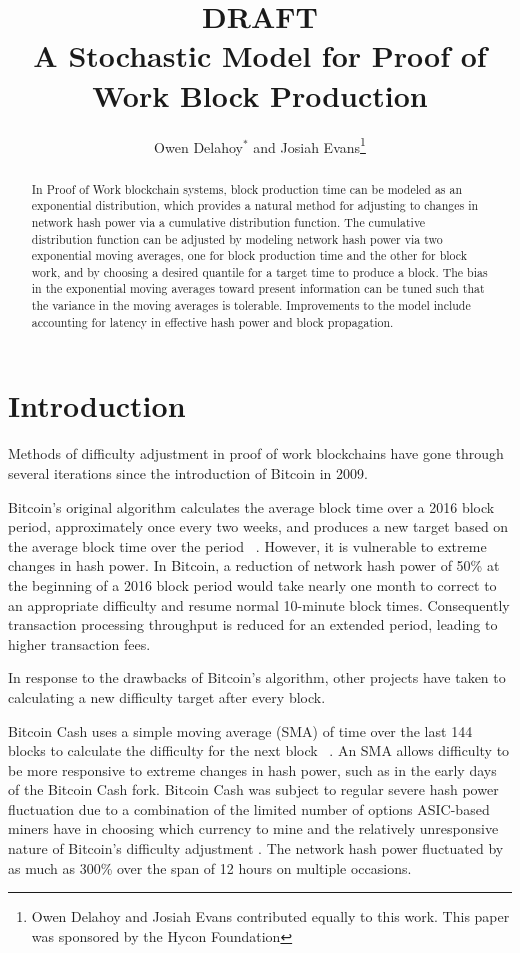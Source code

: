\documentclass[]{article}
\title{\large DRAFT \\ A Stochastic Model for Proof of Work Block Production}
\author{Owen Delahoy$^*$ and Josiah Evans\footnote{Owen Delahoy and Josiah Evans contributed equally to this work. This paper was sponsored by the Hycon Foundation}}
\begin{document}
\maketitle


\begin{abstract}
In Proof of Work blockchain systems, block production time can be modeled as an exponential distribution, which provides a natural method for adjusting to changes in network hash power via a cumulative distribution function.  The cumulative distribution function can be adjusted by modeling network hash power via two exponential moving averages, one for block production time and the other for block work, and by choosing a desired quantile for a target time to produce a block.  The bias in the exponential moving averages toward present information can be tuned such that the variance in the moving averages is tolerable.  Improvements to the model include accounting for latency in effective hash power and block propagation.     
\end{abstract}

\section{Introduction}
Methods of difficulty adjustment in proof of work blockchains have gone through several iterations since the introduction of Bitcoin in 2009.  
\newline

Bitcoin's original algorithm calculates the average block time over a 2016 block period, approximately once every two weeks, and produces a new target based on the average block time over the period ~\cite{BitcoinRetarget}.  However, it is vulnerable to extreme changes in hash power.  In Bitcoin, a reduction of network hash power of 50\% at the beginning of a 2016 block period would take nearly one month to correct to an appropriate difficulty and resume normal 10-minute block times.  Consequently transaction processing throughput is reduced for an extended period, leading to higher transaction fees.   
\newline

In response to the drawbacks of Bitcoin's algorithm, other projects have taken to calculating a new difficulty target after every block.   
\newline

Bitcoin Cash uses a simple moving average (SMA) of time over the last 144 blocks to calculate the difficulty for the next block ~\cite{Bitcoin-ABC}.  An SMA allows difficulty to be more responsive to extreme changes in hash power, such as in the early days of the Bitcoin Cash fork.  Bitcoin Cash was subject to regular severe hash power fluctuation due to a combination of the limited number of options ASIC-based miners have in choosing which currency to mine and the relatively unresponsive nature of Bitcoin's difficulty adjustment \cite{BitcoinCashMining}.  The network hash power fluctuated by as much as 300\% \cite{BitcoinCashDifficulty} over the span of 12 hours on multiple occasions.   
\newline
\end{document}
